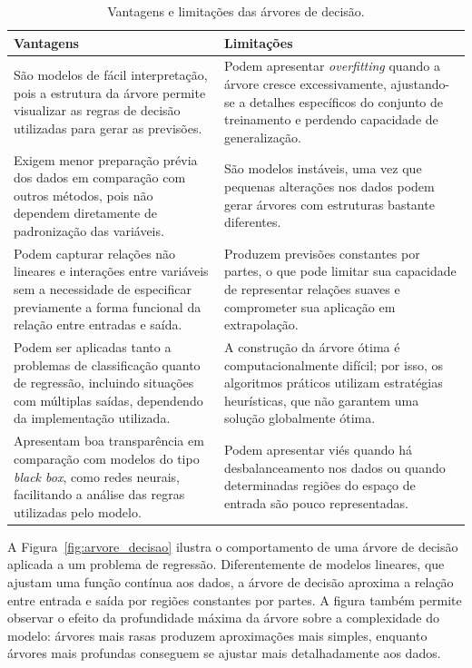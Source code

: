 \begin{table}[H]
\centering
\caption[Vantagens e limitações das árvores de decisão]{Vantagens e limitações das árvores de decisão.}
\label{tab:vantagens_desvantagens_arvores}
\begin{tabular}{p{6.5cm} p{7.5cm}}
\hline
\textbf{Vantagens} & \textbf{Limitações} \\
\hline

São modelos de fácil interpretação, pois a estrutura da árvore permite visualizar as regras de decisão utilizadas para gerar as previsões. 
&
Podem apresentar \textit{overfitting} quando a árvore cresce excessivamente, ajustando-se a detalhes específicos do conjunto de treinamento e perdendo capacidade de generalização. \\

Exigem menor preparação prévia dos dados em comparação com outros métodos, pois não dependem diretamente de padronização das variáveis. 
&
São modelos instáveis, uma vez que pequenas alterações nos dados podem gerar árvores com estruturas bastante diferentes. \\

Podem capturar relações não lineares e interações entre variáveis sem a necessidade de especificar previamente a forma funcional da relação entre entradas e saída. 
&
Produzem previsões constantes por partes, o que pode limitar sua capacidade de representar relações suaves e comprometer sua aplicação em extrapolação. \\

Podem ser aplicadas tanto a problemas de classificação quanto de regressão, incluindo situações com múltiplas saídas, dependendo da implementação utilizada. 
&
A construção da árvore ótima é computacionalmente difícil; por isso, os algoritmos práticos utilizam estratégias heurísticas, que não garantem uma solução globalmente ótima. \\

Apresentam boa transparência em comparação com modelos do tipo \textit{black box}, como redes neurais, facilitando a análise das regras utilizadas pelo modelo. 
&
Podem apresentar viés quando há desbalanceamento nos dados ou quando determinadas regiões do espaço de entrada são pouco representadas. \\

\hline
\end{tabular}
\end{table}

A Figura~\ref{fig:arvore_decisao} ilustra o comportamento de uma árvore de decisão aplicada a um problema de regressão. Diferentemente de modelos lineares, que ajustam uma função contínua aos dados, a árvore de decisão aproxima a relação entre entrada e saída por regiões constantes por partes. A figura também permite observar o efeito da profundidade máxima da árvore sobre a complexidade do modelo: árvores mais rasas produzem aproximações mais simples, enquanto árvores mais profundas conseguem se ajustar mais detalhadamente aos dados.

